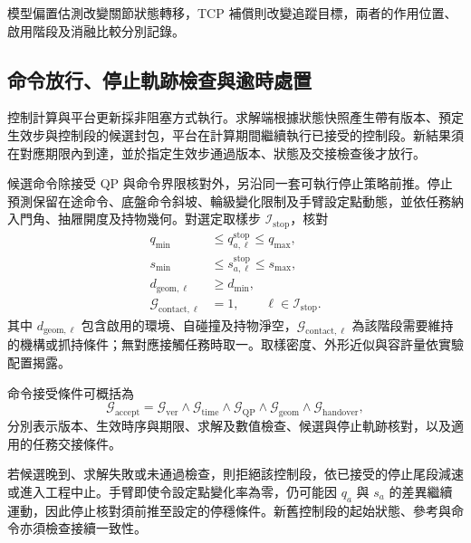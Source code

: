 模型偏置估測改變關節狀態轉移，TCP 補償則改變追蹤目標，兩者的作用位置、啟用階段及消融比較分別記錄。


\subsection{命令放行、停止軌跡檢查與逾時處置}
\label{subsec:command_acceptance_stopping}

控制計算與平台更新採非阻塞方式執行。求解端根據狀態快照產生帶有版本、預定生效步與控制段的候選封包，平台在計算期間繼續執行已接受的控制段。新結果須在對應期限內到達，並於指定生效步通過版本、狀態及交接檢查後才放行。

候選命令除接受 QP 與命令界限核對外，另沿同一套可執行停止策略前推。停止預測保留在途命令、底盤命令斜坡、輪級變化限制及手臂設定點動態，並依任務納入門角、抽屜開度及持物幾何。對選定取樣步 $\mathcal I_{\mathrm{stop}}$，核對
\begin{equation}
    \begin{aligned}
        q_{\min}&\leq q_{a,\ell}^{\mathrm{stop}}\leq q_{\max},\\
        s_{\min}&\leq s_{a,\ell}^{\mathrm{stop}}\leq s_{\max},\\
        d_{\mathrm{geom},\ell}&\geq d_{\min},\\
        \mathcal G_{\mathrm{contact},\ell}&=1,
        \qquad \ell\in\mathcal I_{\mathrm{stop}}.
    \end{aligned}
    \label{eq:ch3_stopping_trajectory_checks}
\end{equation}
其中 $d_{\mathrm{geom},\ell}$ 包含啟用的環境、自碰撞及持物淨空，$\mathcal G_{\mathrm{contact},\ell}$ 為該階段需要維持的機構或抓持條件；無對應接觸任務時取一。取樣密度、外形近似與容許量依實驗配置揭露。

命令接受條件可概括為
\begin{equation}
    \mathcal G_{\mathrm{accept}}
    =\mathcal G_{\mathrm{ver}}
     \land\mathcal G_{\mathrm{time}}
     \land\mathcal G_{\mathrm{QP}}
     \land\mathcal G_{\mathrm{geom}}
     \land\mathcal G_{\mathrm{handover}},
    \label{eq:ch3_control_packet_acceptance}
\end{equation}
分別表示版本、生效時序與期限、求解及數值檢查、候選與停止軌跡核對，以及適用的任務交接條件。

若候選晚到、求解失敗或未通過檢查，則拒絕該控制段，依已接受的停止尾段減速或進入工程中止。手臂即使令設定點變化率為零，仍可能因 $q_a$ 與 $s_a$ 的差異繼續運動，因此停止核對須前推至設定的停穩條件。新舊控制段的起始狀態、參考與命令亦須檢查接續一致性。


